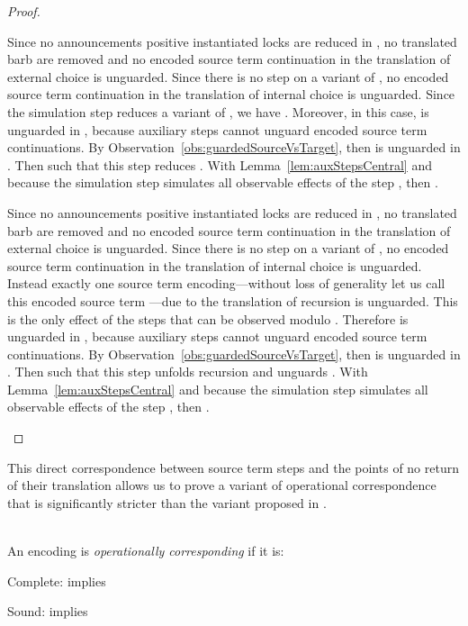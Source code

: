 \documentclass[]{eptcs}
\begin{document}
\begin{proof}
\begin{compactitem}
\begin{compactenum}
				\item Since no announcements \wrt positive instantiated locks are reduced in , no translated barb are removed and no encoded source term continuation in the translation of external choice is unguarded. Since there is no step on a variant of , no encoded source term continuation in the translation of internal choice is unguarded. Since the simulation step reduces a variant of , we have . Moreover, in this case,  is unguarded in , because auxiliary steps cannot unguard encoded source term continuations. By Observation~\ref{obs:guardedSourceVsTarget}, then  is unguarded in . Then  such that this step reduces . With Lemma~\ref{lem:auxStepsCentral} and because the simulation step simulates all observable effects of the step , then .
				\item Since no announcements \wrt positive instantiated locks are reduced in , no translated barb are removed and no encoded source term continuation in the translation of external choice is unguarded. Since there is no step on a variant of , no encoded source term continuation in the translation of internal choice is unguarded. Instead exactly one source term encoding---without loss of generality let us call this encoded source term ---due to the translation of recursion is unguarded. This is the only effect of the steps  that can be observed modulo . Therefore  is unguarded in , because auxiliary steps cannot unguard encoded source term continuations. By Observation~\ref{obs:guardedSourceVsTarget}, then  is unguarded in . Then  such that this step unfolds recursion and unguards . With Lemma~\ref{lem:auxStepsCentral} and because the simulation step simulates all observable effects of the step , then .
			\end{compactenum}
	\end{compactitem}
\end{proof}

\noindent
This direct correspondence between source term steps and the points of no return of their translation allows us to prove a variant of operational correspondence that is significantly stricter than the variant proposed in \cite{gorla10}.

\begin{definition}
	\\
	An encoding  is \emph{operationally corresponding} \wrt  if it is:
	\begin{compactitem}
		\item[\; Complete:]  implies 
		\item[\; Sound:]  implies 
	\end{compactitem}
\end{definition}
\end{document}
